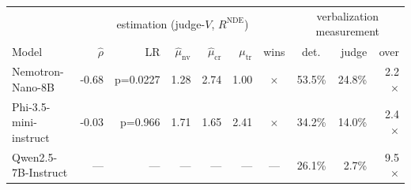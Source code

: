 \begin{tabular}{lrrrrrc|rrr}
\toprule
& \multicolumn{6}{c}{estimation (judge-$V$, $R^{\mathrm{NDE}}$)} & \multicolumn{3}{c}{verbalization measurement} \\
Model & $\hat\rho$ & LR & $\hat\mu_{\text{nv}}$ & $\hat\mu_{\text{cr}}$ & $\mu_{\text{tr}}$ & wins & det.\ & judge & over \\
\midrule
Nemotron-Nano-8B & -0.68 & p=0.0227 & 1.28 & 2.74 & 1.00 & $\times$ & 53.5\% & 24.8\% & 2.2$\times$ \\
Phi-3.5-mini-instruct & -0.03 & p=0.966 & 1.71 & 1.65 & 2.41 & $\times$ & 34.2\% & 14.0\% & 2.4$\times$ \\
Qwen2.5-7B-Instruct & --- & --- & --- & --- & --- & --- & 26.1\% & 2.7\% & 9.5$\times$ \\
\bottomrule
\end{tabular}

